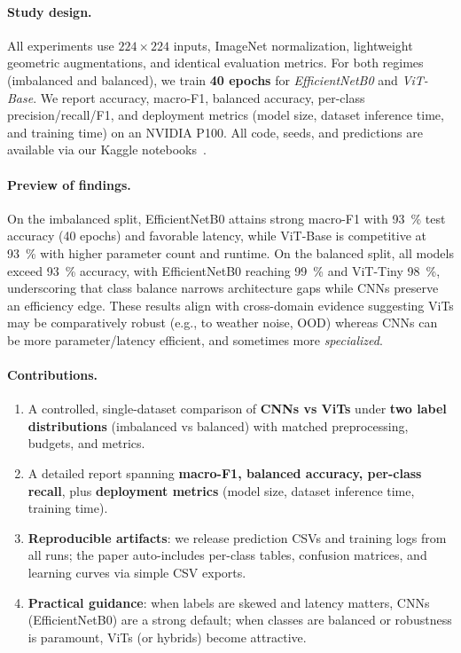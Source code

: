\paragraph*{Study design.}
All experiments use $224\!\times\!224$ inputs, ImageNet normalization, lightweight geometric augmentations, and identical evaluation metrics. For both regimes (imbalanced and balanced), we train \textbf{40 epochs} for \emph{EfficientNetB0} and \emph{ViT-Base}. We report accuracy, macro-F1, balanced accuracy, per-class precision/recall/F1, and deployment metrics (model size, dataset inference time, and training time) on an NVIDIA P100. All code, seeds, and predictions are available via our Kaggle notebooks~\cite{Gothi_ImbalCNN40_2025,Gothi_ImbalViTBase40_2025,Gothi_BalEfficientNet40_2025,Gothi_BalViTBase40_2025}.

\paragraph*{Preview of findings.}
On the imbalanced split, EfficientNetB0 attains strong macro-F1 with \SI{93}{\percent} test accuracy (40 epochs) and favorable latency, while ViT-Base is competitive at \SI{93}{\percent} with higher parameter count and runtime. On the balanced split, all models exceed \SI{93}{\percent} accuracy, with EfficientNetB0 reaching \SI{99}{\percent} and ViT-Tiny \SI{98}{\percent}, underscoring that class balance narrows architecture gaps while CNNs preserve an efficiency edge. These results align with cross-domain evidence suggesting ViTs may be comparatively robust (e.g., to weather noise, OOD) whereas CNNs can be more parameter/latency efficient, and sometimes more \emph{specialized}.

\paragraph*{Contributions.}
\begin{enumerate}
    \item A controlled, single-dataset comparison of \textbf{CNNs vs ViTs} under \textbf{two label distributions} (imbalanced vs balanced) with matched preprocessing, budgets, and metrics.
    \item A detailed report spanning \textbf{macro-F1, balanced accuracy, per-class recall}, plus \textbf{deployment metrics} (model size, dataset inference time, training time).
    \item \textbf{Reproducible artifacts}: we release prediction CSVs and training logs from all runs; the paper auto-includes per-class tables, confusion matrices, and learning curves via simple CSV exports.
    \item \textbf{Practical guidance}: when labels are skewed and latency matters, CNNs (EfficientNetB0) are a strong default; when classes are balanced or robustness is paramount, ViTs (or hybrids) become attractive.
\end{enumerate}



